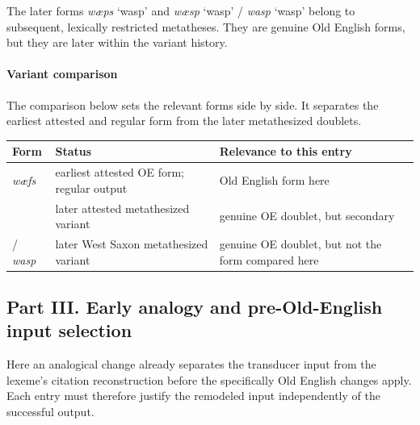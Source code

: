 \documentclass[
  british,
  a4paper,
]{article}
\newcounter{none} %
\begin{document}
The later forms {\emph{wæps}} `wasp' and {\emph{wæsp}} `wasp' /
{\emph{wasp}} `wasp' belong to subsequent, lexically restricted
metatheses. They are genuine Old English forms, but they are later
within the variant history.

\paragraph{Variant comparison}\label{variant-comparison-3}

The comparison below sets the relevant forms side by side. It separates
the earliest attested and regular form from the later metathesized
doublets.

{\def\LTcaptype{none} %
\begin{longtable}[]{@{}
  >{\raggedright\arraybackslash}p{}
  >{\raggedright\arraybackslash}p{}
  >{\raggedright\arraybackslash}p{}@{}}
\toprule\noalign{}
\begin{minipage}[b]{\linewidth}\raggedright
Form
\end{minipage} & \begin{minipage}[b]{\linewidth}\raggedright
Status
\end{minipage} & \begin{minipage}[b]{\linewidth}\raggedright
Relevance to this entry
\end{minipage} \\
\midrule\noalign{}
\endhead
\bottomrule\noalign{}
\endlastfoot
{\emph{wæfs}} & earliest attested OE form; regular output & Old English
form here \\
{\emph{wæps}} & later attested metathesized variant & genuine OE
doublet, but secondary \\
{\emph{wæsp}} / {\emph{wasp}} & later West Saxon metathesized variant &
genuine OE doublet, but not the form compared here \\
\end{longtable}
}

\clearpage

\subsection{Part III. Early analogy and pre-Old-English input
selection}\label{part-iii.-early-analogy-and-pre-old-english-input-selection}

Here an analogical change already separates the transducer input from
the lexeme's citation reconstruction before the specifically Old English
changes apply. Each entry must therefore justify the remodeled input
independently of the successful output.
\end{document}
